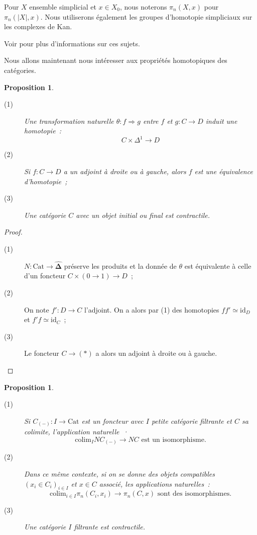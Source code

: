 \documentclass{amsart}
\theoremstyle{plain}
\newtheorem{prop}[theo]{Proposition}
\theoremstyle{definition}
\theoremstyle{remark}
\newcommand{\id}{\mathrm{id}}
\newcommand{\DEns}{\widehat{\mathbf{\Delta}}}
\newcommand{\Cat}{\mathrm{Cat}}
\newcommand{\colim}{\mathrm{colim}}
\newcommand{\ra}{\rightarrow}
\newcommand{\lra}{\longrightarrow}
\begin{document}
Pour $X$ ensemble simplicial et $x\in X_0$, nous noterons $\pi_n(X,x)$ pour $\pi_n(|X|,x)$. Nous utiliserons également les groupes d'homotopie
simpliciaux sur les complexes de Kan.

Voir \cite[chp. 1]{Goer} pour plus d'informations sur ces sujets.

Nous allons maintenant nous intéresser aux propriétés homotopiques des catégories.

\begin{prop}
  \begin{description}
    \item[(1)] Une transformation naturelle $\theta:f\Rightarrow g$ entre $f$ et $g:C\ra D$ induit une homotopie~:
              $$C\times \Delta^1\ra D$$ 
    \item[(2)] Si $f:C\ra D$ a un adjoint à droite ou à gauche, alors $f$ est une équivalence d'homotopie~;
    \item[(3)] Une catégorie $C$ avec un objet initial ou final est contractile. 
  \end{description}
\end{prop}

\begin{proof}
  \begin{description}
    \item[(1)] $N:\Cat\ra \DEns$ préserve les produits et la donnée de $\theta$ est équivalente à celle d'un
              foncteur $C\times (0\ra 1) \ra D$~;
    \item[(2)] On note $f':D\ra C$ l'adjoint. On a alors par (1) des homotopies $ff'\simeq \id_D$ et $f'f\simeq \id_C$~;
    \item[(3)] Le foncteur $C\ra (*)$ a alors un adjoint à droite ou à gauche. 
  \end{description}
\end{proof}

\begin{prop}
  \begin{description}
    \item[(1)] Si $C_{(-)}:I\ra \Cat$ est un foncteur avec $I$ petite catégorie filtrante et $C$ sa colimite, l'application naturelle~·
              $$\colim_I NC_{(-)}\lra NC\text{ est un isomorphisme.}$$ 
    \item[(2)] Dans ce même contexte, si on se donne des objets compatibles $(x_i\in C_i)_{i\in I}$ et $x\in C$ associé, les applications naturelles~:
              $$\colim_{i\in I} \pi_n(C_{i},x_i)\lra \pi_n(C,x)\text{ sont des isomorphismes.}$$
    \item[(3)] Une catégorie $I$ filtrante est contractile. 
  \end{description}
\end{prop}
\end{document}
